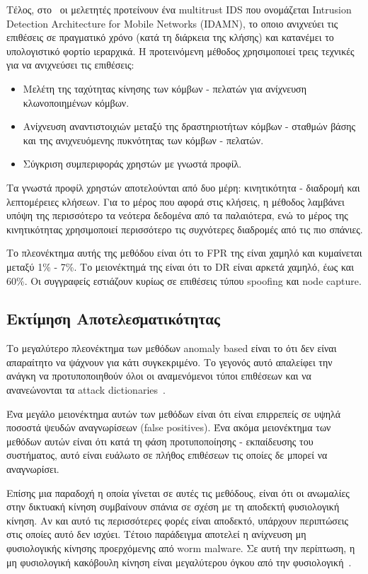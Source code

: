 \documentclass[12pt]{report}
\begin{document}
Τέλος, στο~\cite{paper:17} οι μελετητές προτείνουν ένα \textlatin{multitrust IDS} που ονομάζεται \textlatin{Intrusion Detection Architecture for Mobile Networks (IDAMN)}, το οποιο ανιχνεύει τις επιθέσεις σε πραγματικό χρόνο (κατά τη διάρκεια της κλήσης) και κατανέμει το υπολογιστικό φορτίο ιεραρχικά. Η προτεινόμενη μέθοδος χρησιμοποιεί τρεις τεχνικές για να ανιχνεύσει τις επιθέσεις:
\begin{itemize}
	\item Μελέτη της ταχύτητας κίνησης των κόμβων - πελατών για ανίχνευση κλωνοποιημένων κόμβων.
	\item Ανίχνευση αναντιστοιχιών μεταξύ της δραστηριοτήτων κόμβων - σταθμών βάσης και της ανιχνευόμενης πυκνότητας των κόμβων - πελατών.
	\item Σύγκριση συμπεριφοράς χρηστών με γνωστά προφίλ.
\end{itemize}
Τα γνωστά προφίλ χρηστών αποτελούνται από δυο μέρη: κινητικότητα - διαδρομή και λεπτομέρειες κλήσεων. Για το μέρος που αφορά στις κλήσεις, η μέθοδος λαμβάνει υπόψη της περισσότερο τα νεότερα δεδομένα από τα παλαιότερα, ενώ το μέρος της κινητικότητας χρησιμοποιεί περισσότερο τις συχνότερες διαδρομές από τις πιο σπάνιες.

Το πλεονέκτημα αυτής της μεθόδου είναι ότι το \textlatin{FPR} της είναι χαμηλό και κυμαίνεται μεταξύ 1\% - 7\%. Το μειονέκτημά της είναι ότι το \textlatin{DR} είναι αρκετά χαμηλό, έως και 60\%. Οι συγγραφείς εστιάζουν κυρίως σε επιθέσεις τύπου \textlatin{spoofing} και \textlatin{node capture}.

\subsection{Εκτίμηση Αποτελεσματικότητας}
Το μεγαλύτερο πλεονέκτημα των μεθόδων \textlatin{anomaly based} είναι το ότι δεν είναι απαραίτητο να ψάχνουν για κάτι συγκεκριμένο. Το γεγονός αυτό απαλείφει την ανάγκη να προτυποποιηθούν όλοι οι αναμενόμενοι τύποι επιθέσεων και να ανανεώνονται τα \textlatin{attack dictionaries}~\cite{paper:12}.

Ένα μεγάλο μειονέκτημα αυτών των μεθόδων είναι ότι είναι επιρρεπείς σε υψηλά ποσοστά ψευδών αναγνωρίσεων (\textlatin{false positives}). Ένα ακόμα μειονέκτημα των μεθόδων αυτών είναι ότι κατά τη φάση προτυποποίησης - εκπαίδευσης του συστήματος, αυτό είναι ευάλωτο σε πλήθος επιθέσεων τις οποίες δε μπορεί να αναγνωρίσει.

Επίσης μια παραδοχή η οποία γίνεται σε αυτές τις μεθόδους, είναι ότι οι ανωμαλίες στην δικτυακή κίνηση συμβαίνουν σπάνια σε σχέση με τη αποδεκτή φυσιολογική κίνηση. Αν και αυτό τις περισσότερες φορές είναι αποδεκτό, υπάρχουν περιπτώσεις στις οποίες αυτό δεν ισχύει. Τέτοιο παράδειγμα αποτελεί η ανίχνευση μη φυσιολογικής κίνησης προερχόμενης από \textlatin{worm malware}. Σε αυτή την περίπτωση, η μη φυσιολογική κακόβουλη κίνηση είναι μεγαλύτερου όγκου από την φυσιολογική~\cite{paper:14}.
\end{document}
